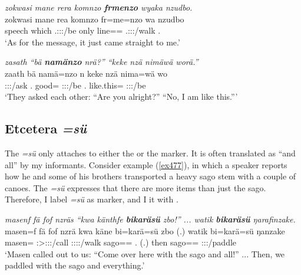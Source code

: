 \begin{exe}
	\ex \emph{zokwasi mane rera komnzo \textbf{frmenzo} wyaka nzudbo.}\\
	\gll zokwasi mane rea komnzo fr=me=nzo wa nzudbo\\
	speech which \Tsg.\F:\Sbj:\Pst:\Ipfv/be only line=\Ins=\Only{} \Tsg.\F:\Sbj:\Pst:\Ipfv/walk \Fsg.\All{}\\
	\trans `As for the message, it just came straight to me.'
	\label{ex475}
\end{exe}
\begin{exe}
	\ex \emph{zasath ``bä \textbf{namänzo} nrä?'' ``keke nzä nimäwä worä.''}\\
	\gll zaath bä namä=nzo n keke nzä nima=wä wo\\
	\Stdu:\Sbj:\Pst:\Pfv/ask \Second.\Abs{} good=\Only{} \Ssg:\Sbj:\Nonpast:\Ipfv/be \Neg{} \Fsg.\Abs{} {like.this}=\Emph{} \Fsg:\Sbj:\Nonpast:\Ipfv/be\\
	\trans `They asked each other: ``Are you alright?'' ``No, I am like this.'''\\
	\label{ex476}
\end{exe}

\subsection{Etcetera \emph{=sü}} \label{etceterasue}

The  \emph{=sü} only attaches to either the  or the   marker. It is often translated as ``and all'' by my informants. Consider example (\ref{ex477}), in which a speaker reports how he and some of his brothers transported a heavy sago stem with a couple of canoes. The \emph{=sü}  expresses that there are more items than just the sago. Therefore, I label \emph{=sü} as  marker, and I  it with \Etc.

\begin{exe}
	\ex \emph{masenf fä fof nzräs ``kwa känthfe \textbf{bikaräsü} zbo!'' ... watik \textbf{bikaräsü} ŋarafinzake.}\\
	\gll masen=f fä fof nzrä kwa käne bi=karä=sü zbo (.) watik bi=karä=sü ŋanzake\\
	masen=\Erg{} \Dist{} \Emph{} \Stsg:\Sbj>\Fpl:\Obj:\Irr:\Pfv/call \Fut{} \Spl:\Sbj:\Imp:\Pfv:\Venit/walk sago=\Prop=\Etc{} \Prox.\All{} (.) then sago=\Prop=\Etc{} \Fpl:\Sbj:\Pst:\Ipfv/paddle\\ 
	\trans `Masen called out to us: ``Come over here with the sago and all!'' ... Then, we paddled with the sago and everything.'
	\label{ex477}
\end{exe}

